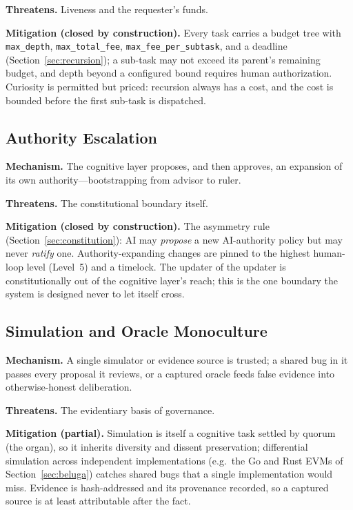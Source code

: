 \textbf{Threatens.} Liveness and the requester's funds.

\textbf{Mitigation (closed by construction).} Every task carries a budget tree with \texttt{max\_depth}, \texttt{max\_total\_fee}, \texttt{max\_fee\_per\_subtask}, and a deadline (Section~\ref{sec:recursion}); a sub-task may not exceed its parent's remaining budget, and depth beyond a configured bound requires human authorization. Curiosity is permitted but priced: recursion always has a cost, and the cost is bounded before the first sub-task is dispatched.

\subsection{Authority Escalation}

\textbf{Mechanism.} The cognitive layer proposes, and then approves, an expansion of its own authority---bootstrapping from advisor to ruler.

\textbf{Threatens.} The constitutional boundary itself.

\textbf{Mitigation (closed by construction).} The asymmetry rule (Section~\ref{sec:constitution}): AI may \emph{propose} a new AI-authority policy but may never \emph{ratify} one. Authority-expanding changes are pinned to the highest human-loop level (Level~5) and a timelock. The updater of the updater is constitutionally out of the cognitive layer's reach; this is the one boundary the system is designed never to let itself cross.

\subsection{Simulation and Oracle Monoculture}

\textbf{Mechanism.} A single simulator or evidence source is trusted; a shared bug in it passes every proposal it reviews, or a captured oracle feeds false evidence into otherwise-honest deliberation.

\textbf{Threatens.} The evidentiary basis of governance.

\textbf{Mitigation (partial).} Simulation is itself a cognitive task settled by quorum (the \SChain{} organ), so it inherits diversity and dissent preservation; differential simulation across independent implementations (e.g.\ the Go and Rust EVMs of Section~\ref{sec:beluga}) catches shared bugs that a single implementation would miss. Evidence is hash-addressed and its provenance recorded, so a captured source is at least attributable after the fact.


